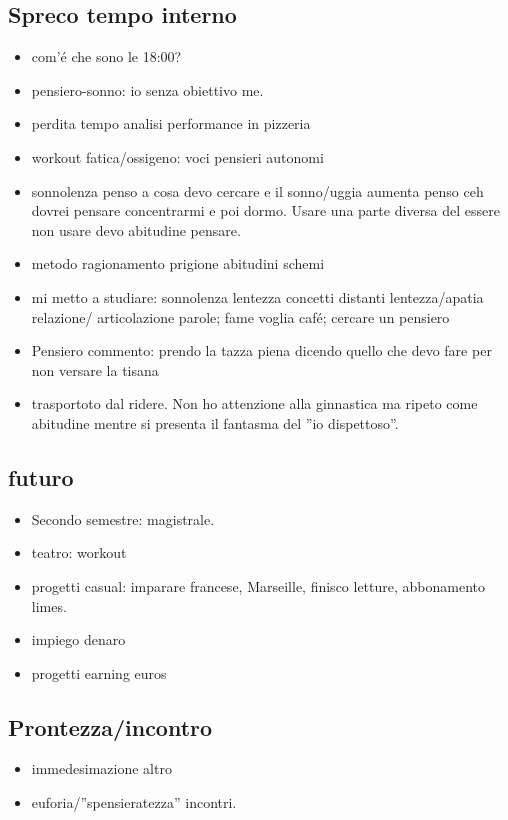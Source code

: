 \subsection{Spreco tempo interno}

\begin{itemize}
\item com'\'e che sono le 18:00?
\item pensiero-sonno: io senza obiettivo me.
\item perdita tempo analisi performance in pizzeria
\item workout fatica/ossigeno: voci pensieri autonomi
\item sonnolenza penso a cosa devo cercare e il sonno/uggia aumenta penso ceh dovrei pensare concentrarmi e poi dormo. Usare una parte diversa del essere non usare devo abitudine pensare.
\item metodo ragionamento prigione abitudini schemi
\item mi metto a studiare: sonnolenza lentezza concetti distanti lentezza/apatia relazione/ articolazione parole; fame voglia caf\'e; cercare un pensiero
\item Pensiero commento: prendo la tazza piena dicendo quello che devo fare per non versare la tisana
\item trasportoto dal ridere. Non ho attenzione alla ginnastica ma ripeto come abitudine mentre si presenta il fantasma del ''io dispettoso''.
\end{itemize}

\subsection{futuro}

\begin{itemize}
\item Secondo semestre: magistrale.
\item teatro: workout
\item progetti casual: imparare francese, Marseille, finisco letture, abbonamento limes.
\item impiego denaro
\item progetti earning euros
\end{itemize}

\subsection{Prontezza/incontro}

\begin{itemize}
\item immedesimazione altro
\item euforia/''spensieratezza'' incontri.
\end{itemize}

